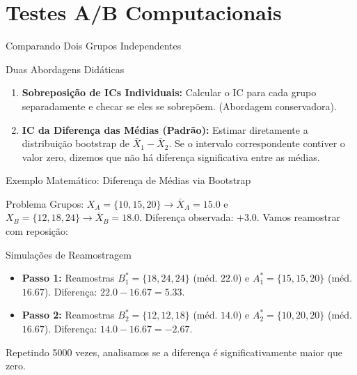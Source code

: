 \section{Testes A/B Computacionais}

\begin{frame}{Comparando Dois Grupos Independentes}
    \begin{block}{Duas Abordagens Didáticas}
        \begin{enumerate}
            \item \textbf{Sobreposição de ICs Individuais:} Calcular o IC para cada grupo separadamente e checar se eles se sobrepõem. (Abordagem conservadora).
            \item \textbf{IC da Diferença das Médias (Padrão):} Estimar diretamente a distribuição bootstrap de $\bar{X}_1 - \bar{X}_2$. Se o intervalo correspondente contiver o valor zero, dizemos que não há diferença significativa entre as médias.
        \end{enumerate}
    \end{block}
\end{frame}

\begin{frame}{Exemplo Matemático: Diferença de Médias via Bootstrap}
    \begin{block}{Problema}
        Grupos: $X_A = \{10, 15, 20\} \rightarrow \bar{X}_A = 15.0$ e $X_B = \{12, 18, 24\} \rightarrow \bar{X}_B = 18.0$.
        Diferença observada: $+3.0$. Vamos reamostrar com reposição:
    \end{block}
    \begin{block}{Simulações de Reamostragem}
        \begin{itemize}
            \item \textbf{Passo 1:} Reamostras $B^*_1 = \{18, 24, 24\}$ (méd. $22.0$) e $A^*_1 = \{15, 15, 20\}$ (méd. $16.67$). Diferença: $22.0 - 16.67 = 5.33$.
            \item \textbf{Passo 2:} Reamostras $B^*_2 = \{12, 12, 18\}$ (méd. $14.0$) e $A^*_2 = \{10, 20, 20\}$ (méd. $16.67$). Diferença: $14.0 - 16.67 = -2.67$.
        \end{itemize}
        Repetindo 5000 vezes, analisamos se a diferença é significativamente maior que zero.
    \end{block}
\end{frame}

